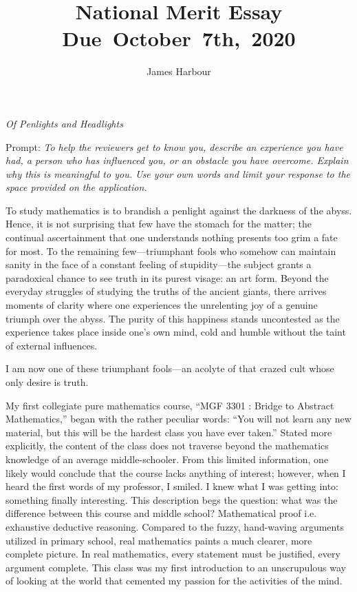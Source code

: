 \documentclass[12pt]{article}
\title{
    \vspace{2in}
    \textmd{\textbf{National Merit Essay}}\\
    \normalsize\vspace{0.1in}\small{Due\ October\ 7th,\ 2020}\\
    \vspace{3in}
}
\author{James Harbour}
\begin{document}
\maketitle
\pagebreak
 \begin{center}
   \emph{Of Penlights and Headlights}
 \end{center}
 Prompt: \emph{To help the reviewers get to know you, describe an experience you have had, a person who has influenced you, or an obstacle you have overcome. Explain why this is meaningful to you. Use your own words and limit your response to the space provided on the application.}
\raggedright\setlength{\parindent}{0.5in}

To study mathematics is to brandish a penlight against the darkness of the abyss. Hence, it is not surprising that few have the stomach for the matter; the continual ascertainment that one understands nothing presents too grim a fate for most. To the remaining few---triumphant fools who somehow can maintain sanity in the face of a constant feeling of stupidity---the subject grants a paradoxical chance to see truth in its purest visage: an art form. Beyond the everyday struggles of studying the truths of the ancient giants, there arrives moments of clarity where one experiences the unrelenting joy of a genuine triumph over the abyss. The purity of this happiness stands uncontested as the experience takes place inside one's own mind, cold and humble without the taint of external influences.

I am now one of these triumphant fools---an acolyte of that crazed cult whose only desire is truth.

My first collegiate pure mathematics course, ``MGF 3301 : Bridge to Abstract Mathematics,'' began with the rather peculiar words: ``You will not learn any new material, but this will be the hardest class you have ever taken.'' Stated more explicitly, the content of the class does not traverse beyond the mathematics knowledge of an average middle-schooler. From this limited information, one likely would conclude that the course lacks anything of interest; however, when I heard the first words of my professor, I smiled. I knew what I was getting into: something finally interesting. This description begs the question: what was the difference between this course and middle school? Mathematical proof i.e. exhaustive deductive reasoning. Compared to the fuzzy, hand-waving arguments utilized in primary school, real mathematics paints a much clearer, more complete picture. In real mathematics, every statement must be justified, every argument complete. This class was my first introduction to an unscrupulous way of looking at the world that cemented my passion for the activities of the mind.
\end{document}
